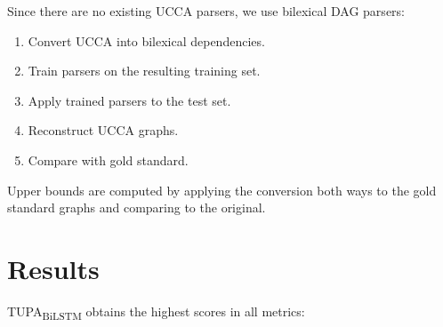\documentclass[a0,portrait]{a0poster}
\newcommand{\parser}[1]{TUPA\textsubscript{#1}}
\begin{document}
\begin{multicols}{2}
Since there are no existing UCCA parsers, we use bilexical DAG parsers:
\begin{enumerate}
 \item Convert UCCA into bilexical dependencies.
 \item Train parsers on the resulting training set.
 \item Apply trained parsers to the test set.
 \item Reconstruct UCCA graphs.
 \item Compare with gold standard.
\end{enumerate}
Upper bounds are computed by applying
the conversion both ways to the gold standard
graphs and comparing to the original.



\section*{Results}

\parser{BiLSTM} obtains the highest scores in all metrics:
	  

\end{multicols}
\end{document}
